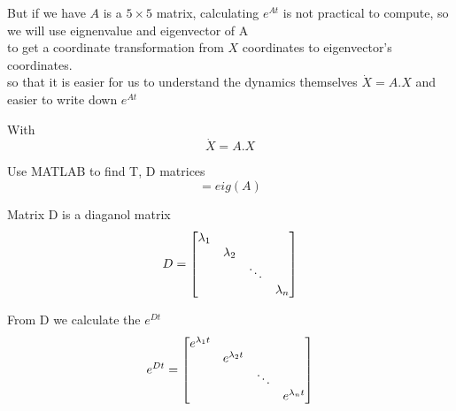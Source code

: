 \documentclass{article}
\begin{document}
But if we have $ A $ is a $5 \times 5$ matrix, calculating $ e^{At} $ is not practical to compute, so we will use eignenvalue and eigenvector of A
\\to get a coordinate transformation from $ X $ coordinates to eigenvector's coordinates.
\\so that it is easier for us to understand the dynamics themselves $ \dot{X} = A.X $ and easier to write down $ e^{At} $

With 
\begin{equation} 
  \dot{X} = A.X
\end{equation}

Use MATLAB to find T, D matrices
\begin{equation}
  [T, D] = eig(A)
\end{equation}

Matrix D is a diaganol matrix
\begin{equation} 
D = \begin{bmatrix}
      $$\lambda_{1}$$ &  &  &\\ 
      & $$\lambda_{2}$$   &  &\\ 
      & & \ddots & \\ 
      & & & $$\lambda_{n}$$
    \end{bmatrix}
  \end{equation}

From D we calculate the $e^{Dt}$  
  \\\begin{equation} 
    e^{Dt} = 
      \begin{bmatrix} 
        $$e^{\lambda_{1}t}$$  &  &  & \\ 
        & $$e^{\lambda_{2}t}$$   &  & \\ 
        & & \ddots & \\ 
        & & & $$e^{\lambda_{n}t}$$
      \end{bmatrix} 
    \end{equation}
\end{document}
